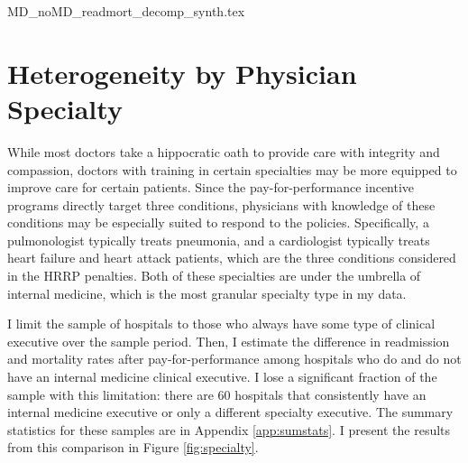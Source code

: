 \documentclass[12pt]{article}
\begin{document}
    {MD_noMD_readmort_decomp_synth.tex}

    \section{Heterogeneity by Physician Specialty}

    While most doctors take a hippocratic oath to provide care with integrity and compassion, doctors with training in certain specialties may be more equipped to improve care for certain patients. Since the pay-for-performance incentive programs directly target three conditions, physicians with knowledge of these conditions may be especially suited to respond to the policies. Specifically, a pulmonologist typically treats pneumonia, and a cardiologist typically treats heart failure and heart attack patients, which are the three conditions considered in the HRRP penalties. Both of these specialties are under the umbrella of internal medicine, which is the most granular specialty type in my data.

    I limit the sample of hospitals to those who always have some type of clinical executive over the sample period. Then, I estimate the difference in readmission and mortality rates after pay-for-performance among hospitals who do and do not have an internal medicine clinical executive. I lose a significant fraction of the sample with this limitation: there are 60 hospitals that consistently have an internal medicine executive or only a different specialty executive. The summary statistics for these samples are in Appendix \ref{app:sumstats}. I present the results from this comparison in Figure \ref{fig:specialty}.
\end{document}
